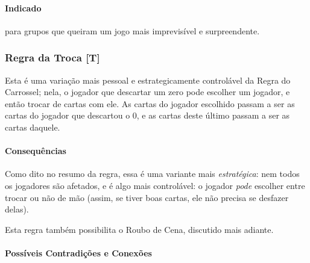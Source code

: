 \paragraph{Indicado}

para grupos que queiram um jogo mais imprevisível e surpreendente.

\subsubsection{Regra da Troca [T]}

Esta é uma variação mais pessoal e estrategicamente controlável da Regra do Carrossel; nela, o jogador que descartar um zero pode escolher um jogador, e então trocar de cartas com ele. As cartas do jogador escolhido passam a ser as cartas do jogador que descartou o 0, e as cartas deste último passam a ser as cartas daquele.

\paragraph{Consequências}

Como dito no resumo da regra, essa é uma variante mais \emph{estratégica}: nem todos os jogadores são afetados, e é algo mais controlável: o jogador \emph{pode} escolher entre trocar ou não de mão (assim, se tiver boas cartas, ele não precisa se desfazer delas).

Esta regra também possibilita o Roubo de Cena, discutido mais adiante.

\paragraph{Possíveis Contradições e Conexões}

